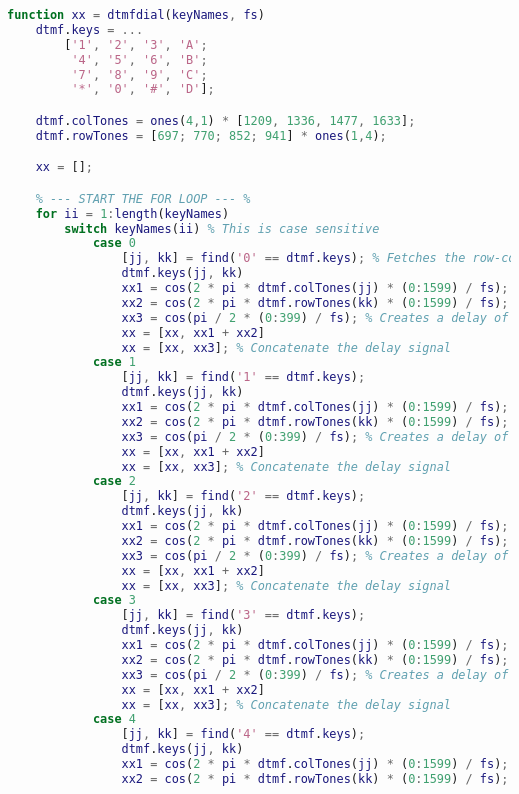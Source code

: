 \begin{lstlisting}[language=Matlab]
function xx = dtmfdial(keyNames, fs)
    dtmf.keys = ...
        ['1', '2', '3', 'A';
         '4', '5', '6', 'B';
         '7', '8', '9', 'C';
         '*', '0', '#', 'D'];

    dtmf.colTones = ones(4,1) * [1209, 1336, 1477, 1633];
    dtmf.rowTones = [697; 770; 852; 941] * ones(1,4);

    xx = [];

    % --- START THE FOR LOOP --- %
    for ii = 1:length(keyNames)
        switch keyNames(ii) % This is case sensitive
            case 0
                [jj, kk] = find('0' == dtmf.keys); % Fetches the row-column indices
                dtmf.keys(jj, kk)
                xx1 = cos(2 * pi * dtmf.colTones(jj) * (0:1599) / fs); % First signal
                xx2 = cos(2 * pi * dtmf.rowTones(kk) * (0:1599) / fs); % Second Signal
                xx3 = cos(pi / 2 * (0:399) / fs); % Creates a delay of 0.05 secs
                xx = [xx, xx1 + xx2]
                xx = [xx, xx3]; % Concatenate the delay signal
            case 1
                [jj, kk] = find('1' == dtmf.keys);
                dtmf.keys(jj, kk)
                xx1 = cos(2 * pi * dtmf.colTones(jj) * (0:1599) / fs);
                xx2 = cos(2 * pi * dtmf.rowTones(kk) * (0:1599) / fs);
                xx3 = cos(pi / 2 * (0:399) / fs); % Creates a delay of 0.05 secs
                xx = [xx, xx1 + xx2]
                xx = [xx, xx3]; % Concatenate the delay signal
            case 2
                [jj, kk] = find('2' == dtmf.keys);
                dtmf.keys(jj, kk)
                xx1 = cos(2 * pi * dtmf.colTones(jj) * (0:1599) / fs);
                xx2 = cos(2 * pi * dtmf.rowTones(kk) * (0:1599) / fs);
                xx3 = cos(pi / 2 * (0:399) / fs); % Creates a delay of 0.05 secs
                xx = [xx, xx1 + xx2]
                xx = [xx, xx3]; % Concatenate the delay signal
            case 3
                [jj, kk] = find('3' == dtmf.keys);
                dtmf.keys(jj, kk)
                xx1 = cos(2 * pi * dtmf.colTones(jj) * (0:1599) / fs);
                xx2 = cos(2 * pi * dtmf.rowTones(kk) * (0:1599) / fs);
                xx3 = cos(pi / 2 * (0:399) / fs); % Creates a delay of 0.05 secs
                xx = [xx, xx1 + xx2]
                xx = [xx, xx3]; % Concatenate the delay signal
            case 4
                [jj, kk] = find('4' == dtmf.keys);
                dtmf.keys(jj, kk)
                xx1 = cos(2 * pi * dtmf.colTones(jj) * (0:1599) / fs);
                xx2 = cos(2 * pi * dtmf.rowTones(kk) * (0:1599) / fs);

\end{lstlisting}
